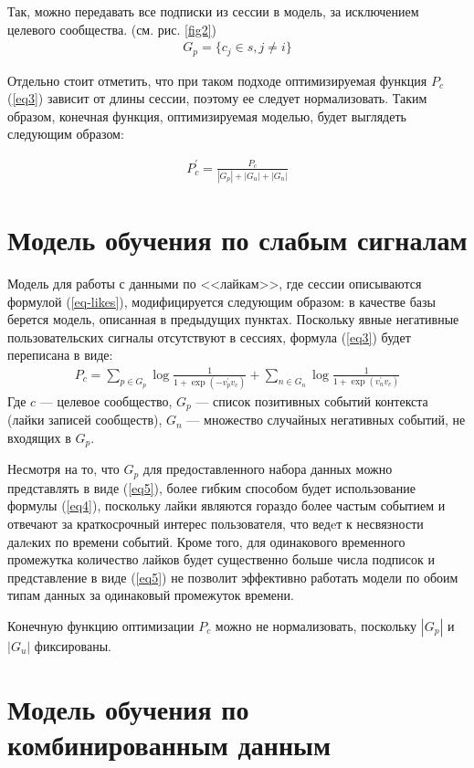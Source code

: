 \documentclass[times,specification,annotation]{itmo-student-thesis}
\begin{document}
Так, можно передавать все подписки из сессии в модель, за исключением целевого сообщества. (см. рис. \ref{fig2})
\begin{align}
G_p =\{c_j \in s, j \ne i\} \label{eq5}
\end{align}

Отдельно стоит отметить, что при таком подходе оптимизируемая функция $P_c$ (\ref{eq3}) зависит от длины сессии, поэтому ее следует нормализовать. Таким образом, конечная функция, оптимизируемая моделью, будет выглядеть следующим образом: 

\begin{align}
P_c^{'} = \frac{P_c}{|G_p| + |G_u| + |G_n|} \label{eq6}
\end{align}

\section{Модель обучения по слабым сигналам}\label{sec:algo-likes}

Модель для работы с данными по <<лайкам>>, где сессии описываются формулой (\ref{eq-likes}), модифицируется следующим образом: в качестве базы берется модель, описанная в предыдущих пунктах. Поскольку явные негативные пользовательских сигналы отсутствуют в сессиях, формула (\ref{eq3}) будет переписана в виде:
\begin{align}
P_c = \sum_{p \in G_p} \log \frac{1}{1 + \exp(-v_p^{'}v_c)} + \sum_{n \in G_n} \log \frac{1}{1 + \exp(v_n^{'}v_c)} \label{eq7}
 \end{align}
Где $c$ --- целевое сообщество, $G_p$ --- список позитивных событий
контекста (лайки записей сообществ), $G_n$ --- множество случайных негативных событий, не входящих в $G_p$. 

Несмотря на то, что $G_p$ для предоставленного набора данных можно представлять в виде (\ref{eq5}), более гибким способом будет использование формулы (\ref{eq4}), поскольку лайки являются гораздо более частым событием и отвечают за краткосрочный интерес пользователя, что ведeт к несвязности далeких по времени событий. Кроме того, для одинакового временного промежутка количество лайков будет существенно больше числа подписок и представление в виде (\ref{eq5}) не позволит эффективно работать модели по обоим типам данных за одинаковый промежуток времени. 

Конечную функцию оптимизации  $P_c$ можно не нормализовать, поскольку $|G_p|$ и $|G_u|$ фиксированы.

\section{Модель обучения по комбинированным данным}\label{sec:algo-combined}
\end{document}
